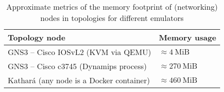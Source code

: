 \begin{table}
  \centering
  \small
  \begin{tabulary}{0.9\textwidth}{ll}
    \toprule
      \textbf{Topology node}                   & \textbf{Memory usage}\\
    \midrule
      GNS3 -- Cisco IOSvL2 (KVM via QEMU)      & $\approx 4~\mbox{MiB}$\\
      GNS3 -- Cisco c3745 (Dynamips process)   & $\approx 270~\mbox{MiB}$\\
      Kathará (any node is a Docker container) & $\approx 460~\mbox{MiB}$\\
    \bottomrule
  \end{tabulary}
  \caption{%
    Approximate metrics of the memory footprint of (networking) nodes in topologies for different emulators
  }
  \label{tab:comparativeramusage}
\end{table}
